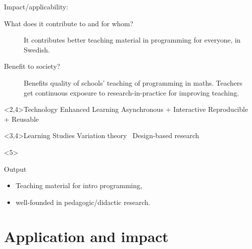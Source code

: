 Impact/applicability:
\begin{description}
  \item[What does it contribute to and for whom?]
    It contributes better teaching material in programming for everyone, in 
    Swedish.

  \item[Benefit to society?]
    Benefits quality of schools' teaching of programming in maths.
    Teachers get continuous exposure to research-in-practice for improving 
    teaching.
\end{description}

\begin{frame}
  \begin{block}<2,4>{Technology Enhanced Learning}
    \hitem Asynchronous + Interactive
    \quad
    \hitem Reproducible + Reusable
  \end{block}

  \begin{center}
    \Large\bfseries
  \end{center}

  \begin{block}<3,4>{Learning Studies}
    \hitem Variation theory~\cite{VariationTheory}
    \qquad
    \hitem Design-based research~\cite{DesignBasedResearch}
  \end{block}

  \begin{onlyenv}<5>
    \begin{alertblock}{Output}
      \begin{itemize}
        \item Teaching material for intro programming,
        \item well-founded in pedagogic/didactic research.
      \end{itemize}
    \end{alertblock}
  \end{onlyenv}
\end{frame}

\section{Application and impact}


